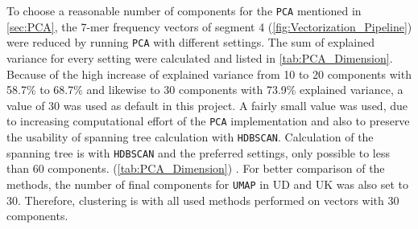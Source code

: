 \vspace{1em}

To choose a reasonable number of components for the \texttt{PCA} mentioned in \autoref{sec:PCA}, the 7-mer frequency vectors of segment 4 (\autoref{fig:Vectorization_Pipeline}) were reduced by running \texttt{PCA} with different settings. The sum of explained variance for every setting were calculated and listed in \autoref{tab:PCA_Dimension}. Because of the high increase of explained variance from 10 to 20 components with 58.7\% to 68.7\% and likewise to 30 components with 73.9\% explained variance, a value of 30 was used as default in this project. A fairly small value was used, due to increasing computational effort of the \texttt{PCA} implementation and also to preserve the usability of spanning tree calculation with \texttt{HDBSCAN}. Calculation of the spanning tree is with \texttt{HDBSCAN} and the preferred settings, only possible to less than 60 components. (\autoref{tab:PCA_Dimension}) \autocite{mcinnes_hdbscan_2017, scipy_10_contributors_scipy_2020}. For better comparison of the methods, the number of final components for \texttt{UMAP} in UD and UK was also set to 30. Therefore, clustering is with all used methods performed on vectors with 30 components.

\begin{table}[!hbt]
    \centering
    \caption[Explained variance by different PCA settings]{\textbf{Explained variance by different PCA settings.} The explained variance of specific \texttt{PCA} settings used on the 7-mer frequency vectors of segment 4. A result of 0.587 as for 10 components represents 58.7\% of the variance is explained by the first 10 components of the vector. The more components are extracted the lower the increase in additional explained variance \autocite{pearson_liii_1901}.}
    \label{tab:PCA_Dimension}
\end{table}

